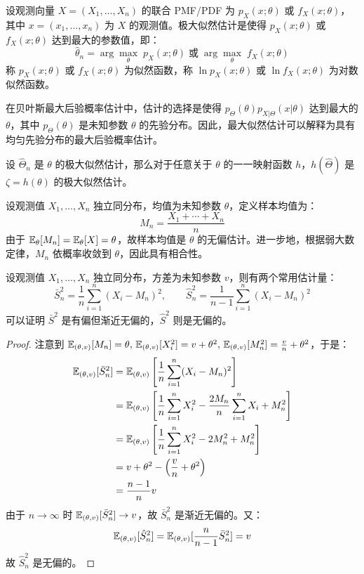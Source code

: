 \begin{definition}
设观测向量 $X=(X_1,\ldots,X_n)$ 的联合 PMF/PDF 为 $p_X(x;\theta)$ 或 $f_X(x;\theta)$，其中 $x=(x_1,\ldots,x_n)$ 为 $X$ 的观测值。极大似然估计是使得 $p_X(x;\theta)$ 或 $f_X(x;\theta)$ 达到最大的参数值，即：
\[
\hat\theta_n=\arg\max_\theta\;p_X(x;\theta)\;\text{或}\;\arg\max_\theta\;f_X(x;\theta)
\]
称 $p_X(x;\theta)$ 或 $f_X(x;\theta)$ 为似然函数，称 $\ln p_X(x;\theta)$ 或 $\ln f_X(x;\theta)$ 为对数似然函数。
\end{definition}

\begin{remark}[极大似然估计与最大后验概率估计]
在贝叶斯最大后验概率估计中，估计的选择是使得 $p_\Theta(\theta)p_{X\vert\Theta}(x\vert\theta)$ 达到最大的 $\theta$，其中 $p_\Theta(\theta)$ 是未知参数 $\theta$ 的先验分布。因此，最大似然估计可以解释为具有均匀先验分布的最大后验概率估计。
\end{remark}

\begin{theorem}[极大似然估计的不变原理]
设 $\hat\Theta_n$ 是 $\theta$ 的极大似然估计，那么对于任意关于 $\theta$ 的一一映射函数 $h$，$h(\hat\Theta)$ 是 $\zeta=h(\theta)$ 的极大似然估计。
\end{theorem}

\begin{example}[随机变量均值的估计]
设观测值 $X_1,\ldots,X_n$ 独立同分布，均值为未知参数 $\theta$，定义样本均值为：
\[
M_n=\frac{X_1+\cdots+X_n}{n}
\]
由于 $\mathbb{E}_\theta[M_n]=\mathbb{E}_\theta[X]=\theta$，故样本均值是 $\theta$ 的无偏估计。进一步地，根据弱大数定律，$M_n$ 依概率收敛到 $\theta$，因此具有相合性。
\end{example}

\begin{example}[随机变量方差的估计]
设观测值 $X_1,\ldots,X_n$ 独立同分布，方差为未知参数 $v$，则有两个常用估计量：
\[
\bar S_n^2=\frac{1}{n}\sum\limits_{i=1}^n (X_i-M_n)^2,\qquad\hat S_n^2=\frac{1}{n-1}\sum\limits_{i=1}^n (X_i-M_n)^2
\]
可以证明 $\bar S^2$ 是有偏但渐近无偏的，$\hat S^2$ 则是无偏的。
\end{example}
\begin{proof}
注意到 $\mathbb{E}_{(\theta,v)}[M_n]=\theta,\,\mathbb{E}_{(\theta,v)}[X_i^2]=v+\theta^2,\,\mathbb{E}_{(\theta,v)}[M_n^2]=\frac{v}{n}+\theta^2$，于是：
\begin{align*}
\mathbb{E}_{(\theta,v)}[\bar S_n^2]&=\mathbb{E}_{(\theta,v)}\left[\frac{1}{n}\sum_{i=1}^n(X_i-M_n)^2\right]\\
&=\mathbb{E}_{(\theta,v)}\left[\frac{1}{n}\sum_{i=1}^nX_i^2-\frac{2M_n}{n}\sum_{i=1}^nX_i+M_n^2\right]\\
&=\mathbb{E}_{(\theta,v)}\left[\frac{1}{n}\sum_{i=1}^nX_i^2-2M_n^2+M_n^2\right]\\
&=v+\theta^2-\left(\frac{v}{n}+\theta^2\right)\\
&=\frac{n-1}{n}v
\end{align*}
由于 $n\to\infty$ 时 $\mathbb{E}_{(\theta,v)}[\bar S_n^2]\to v$，故 $\bar S_n^2$ 是渐近无偏的。又：
\[
\mathbb{E}_{(\theta,v)}[\hat S_n^2]=\mathbb{E}_{(\theta,v)}[\frac{n}{n-1}\bar S_n^2]=v
\]
故 $\hat S_n^2$ 是无偏的。
\end{proof}

